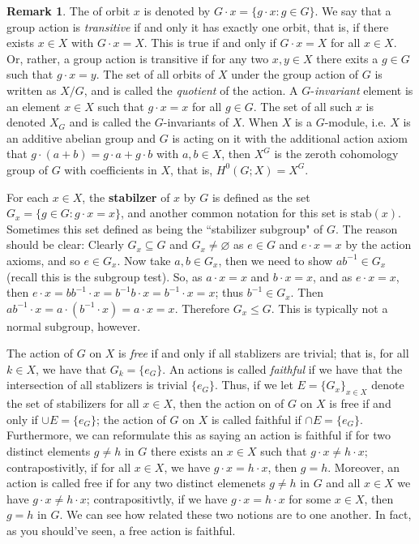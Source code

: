 \documentclass[9pt,reqno]{amsart}
\theoremstyle{definition}
\newtheorem{rem}{Remark}[section]
\begin{document}
\begin{rem}
	The of orbit $x$ is denoted by $G \cdot x = \{ g \cdot x \colon g \in G \}$. We say that a group action is \textit{transitive} if and only it has exactly one orbit, that is, if there exists $x \in X$ with $G \cdot x = X$. This is true if and only if $G \cdot x = X$ for all $x \in X$. Or, rather, a group action is transitive if for any two $x, y \in X$ there exits a $g \in G$ such that $g \cdot x =y$. The set of all orbits of $X$ under the group action of $G$ is written as $X/G$, and is called the \textit{quotient} of the action. A $G$-\textit{invariant} element is an element $x \in X$ such that $g \cdot x = x$ for all $g \in G$. The set of all such $x$ is denoted $X_G$ and is called the $G$-invariants of $X$. When $X$ is a $G$-module, i.e. $X$ is an additive abelian group and $G$ is acting on it with the additional action axiom that $g \cdot (a+b) = g \cdot a + g \cdot b$ with $a, b \in X$, then $X^G$ is the zeroth cohomology group of $G$ with coefficients in $X$, that is, $H^0 (G; X) = X^G$.
	
	For each $x \in X$, the \textbf{stabilzer} of $x$ by $G$ is defined as the set $G_x = \{ g \in G \colon g \cdot x = x \}$, and another common notation for this set is $\text{stab} (x)$. Sometimes this set defined as being the ``stabilizer subgroup" of $G$. The reason should be clear: Clearly $G_x \subseteq G$ and $G_x \neq \varnothing$ as $e \in G $ and $e \cdot x = x$ by the action axioms, and so $e \in G_x$. Now take $a, b \in G_x$, then we need to show $ab^{-1} \in G_x$ (recall this is the subgroup test). So, as $a \cdot x = x $ and $b \cdot x = x$, and as $e \cdot x = x$, then $e \cdot x = bb^{-1} \cdot x = b^{-1} b \cdot x = b^{-1} \cdot x = x$; thus $b^{-1} \in G_x$. Then $ab^{-1} \cdot x = a \cdot (b^{-1} \cdot x) = a \cdot x = x$. Therefore $G_x \leq G$. This is typically not a normal subgroup, however. 
	
	The action of $G$ on $X$ is \textit{free} if and only if all stablizers are trivial; that is, for all $k \in X$, we have that $G_k = \{ e_G \}$. An actions is called \textit{faithful} if we have that the intersection of all stablizers is trivial $\{ e_G \}$. Thus, if we let $E = \{G_x \}_{x \in X}$ denote the set of stabilizers for all $x \in X$, then the action on of $G$ on $X$ is free if and only if $\cup E = \{e_G \}$; the action of $G$ on $X$ is called faithful if $\cap E = \{e_G \}$. Furthermore, we can reformulate this as saying an action is faithful if for two distinct elements $g \neq h$ in $G$ there exists an $x \in X$ such that $g \cdot x \neq h \cdot x$; contrapostivitly, if for all $x \in X$, we have $g \cdot x = h \cdot x$, then $g = h$. Moreover, an action is called free if for any two distinct elemenets $g \neq h$ in $G$ and all $x \in X$ we have $g \cdot x \neq h \cdot x$; contrapositivtly, if we have $g \cdot x = h \cdot x$ for some $x \in X$, then $g = h$ in $G$. We can see how related these two notions are to one another. In fact, as you should've seen, a free action is faithful. 
\end{rem}
\end{document}
